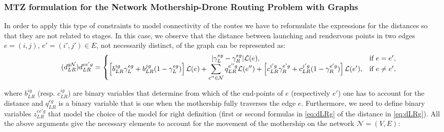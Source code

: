 \subsubsection{MTZ formulation for the Network Mothership-Drone Routing Problem with Graphs}
\noindent
In order to apply this type of constraints to model connectivity of the routes we have to reformulate the expressions for the distances so that they are not related to stages. In this case, we observe that the distance between launching and rendezvous points in two edges $e=(i,j),\, e'=(i',j')\in E$, not necessarily distinct,  of the graph can be represented as:
\begin{equation}\tag{$d^{g\mathcal N}_{LR}$}\label{eq:dLRg}
d_{LR}^{ee'g} = \left\{\begin{matrix}
|\gamma_{L}^{eg} - \gamma_{R}^{eg}|\mathcal L(e), & \text{if } e = e',\\
\left[b_{LR}^{ig}\gamma_{L}^{eg} + b_{LR}^{jg}(1 - \gamma_{L}^{eg})\right]\mathcal L(e) + \displaystyle \sum_{e''\in \mathcal N}q_{LR}^{e''g}\mathcal L(e'') + \left[c_{LR}^{i'g}\gamma_{R}^{e'g} + c_{LR}^{j'g}(1 - \gamma_{R}^{e'g})\right]\mathcal{L}(e'), & \text{if } e \neq e',
\end{matrix}\right.
\end{equation}

\noindent
where $b_{LR}^{ig}$ (resp. $c_{LR}^{ig}$) are binary variables that determine from which of the end-points of $e$ (respectively $e'$) one has to account for the distance and $q_{LR}^{eg}$ is a binary variable that is one when the mothership fully traverses the edge $e$. Furthermore, we need to define binary variables $z_{LR}^{ee'g}$ that model the choice of the model for right definition (first or second formulas in \eqref{eq:dLRg} of the distance in \eqref{eq:dLRg}). All the above arguments give the necessary elements to account for the movement of the mothership on the network $\mathcal{N}=(V,E)$:

